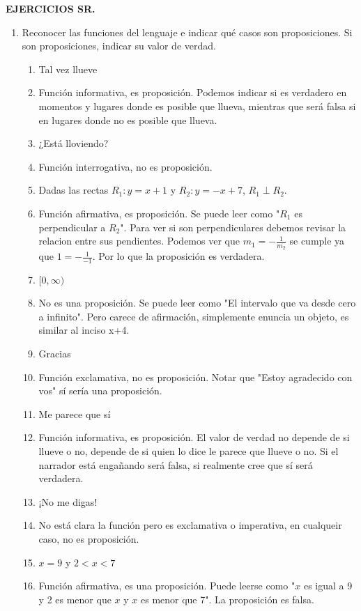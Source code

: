 \documentclass[a4paper]{article}
\newcommand{\answer}{\item[**]}
\newcommand{\exercise}{\item}
\begin{document}
\textbf{EJERCICIOS SR.}
\begin{enumerate}[resume]

	\exercise Reconocer las funciones del lenguaje e indicar qué casos son proposiciones. Si son proposiciones, indicar su valor de verdad.
	\begin{multicols}{2}
	\begin{enumerate} [label=(\alph*)]

		\item Tal vez llueve
		\answer Función informativa, es proposición. Podemos indicar si es verdadero en momentos y lugares donde es posible que llueva, mientras que será falsa si en lugares donde no es posible que llueva.

		\item ¿Está lloviendo?
		\answer Función interrogativa, no es proposición.

		\item Dadas las rectas $R_1: y=x+1$ y $R_2: y=-x+7$, $R_1 \perp R_2$.
		\answer Función afirmativa, es proposición. Se puede leer como "$R_1$ es perpendicular a $R_2$". Para ver si son perpendiculares debemos revisar la relacion entre sus pendientes. Podemos ver que $m_1 = -\frac{1}{m_2}$ se cumple ya que $1 = -\frac{1}{-1}$. Por lo que la proposición es verdadera.

		\item $ [ 0, \infty )$
		\answer No es una proposición. Se puede leer como "El intervalo que va desde cero a infinito". Pero carece de afirmación, simplemente enuncia un objeto, es similar al inciso x+4.

		\item Gracias
		\answer Función exclamativa, no es proposición. Notar que "Estoy agradecido con vos" sí sería una proposición.

		\item Me parece que sí 
		\answer Función informativa, es proposición. El valor de verdad no depende de si llueve o no, depende de si quien lo dice le parece que llueve o no. Si el narrador está engañando será falsa, si realmente cree que sí será verdadera.

		\item ¡No me digas!
		\answer No está clara la función pero es exclamativa o imperativa, en cualqueir caso, no es proposición.

		\item $x=9$ y $2 < x < 7$
		\answer Función afirmativa, es una proposición. Puede leerse como "$x$ es igual a 9 y 2 es menor que $x$ y $x$ es menor que 7". La proposición es falsa.


\end{enumerate}
\end{multicols}
\end{enumerate}
\end{document}
